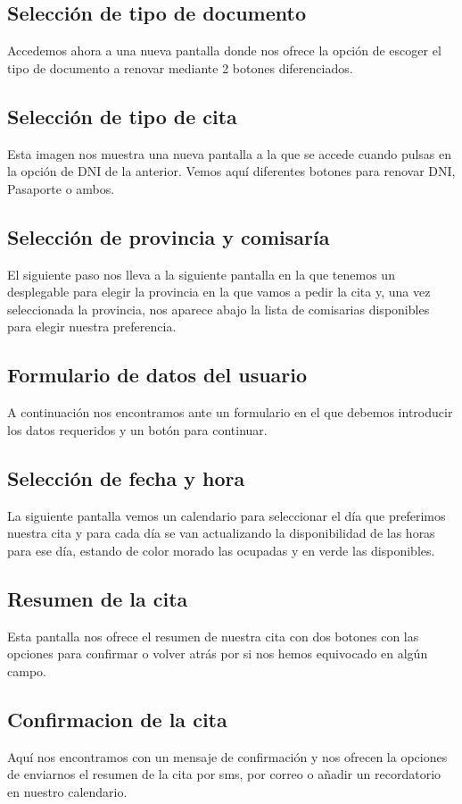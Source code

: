 \documentclass[a4paper,11pt]{article}
\begin{document}
\subsection{Selección de tipo de documento}
Accedemos ahora a una nueva pantalla donde nos ofrece la opción de escoger el tipo de documento a renovar mediante 2 botones diferenciados.

\subsection{Selección de tipo de cita}
Esta imagen nos muestra una nueva pantalla a la que se accede cuando pulsas en la opción de DNI de la anterior. Vemos aquí diferentes botones para renovar DNI, Pasaporte o ambos.

\subsection{Selección de provincia y comisaría}
El siguiente paso nos lleva a la siguiente pantalla en la que tenemos un desplegable para elegir la provincia en la que vamos a pedir la cita y, una vez seleccionada la provincia, nos aparece abajo la lista de comisarias disponibles para elegir nuestra preferencia.

\subsection{Formulario de datos del usuario}
A continuación nos encontramos ante un formulario en el que debemos introducir los datos requeridos y un botón para continuar.


\subsection{Selección de fecha y hora}
La siguiente pantalla vemos un calendario para seleccionar el día que preferimos nuestra cita y para cada día se van actualizando la disponibilidad de las horas para ese día, estando de color morado las ocupadas y en verde las disponibles.

\subsection{Resumen de la cita}
Esta pantalla nos ofrece el resumen de nuestra cita con dos botones con las opciones para confirmar o volver atrás por si nos hemos equivocado en algún campo.

\subsection{Confirmacion de la cita}
Aquí nos encontramos con un mensaje de confirmación y nos ofrecen la opciones de enviarnos el resumen de la cita por sms, por correo o añadir un recordatorio en nuestro calendario.
\end{document}
